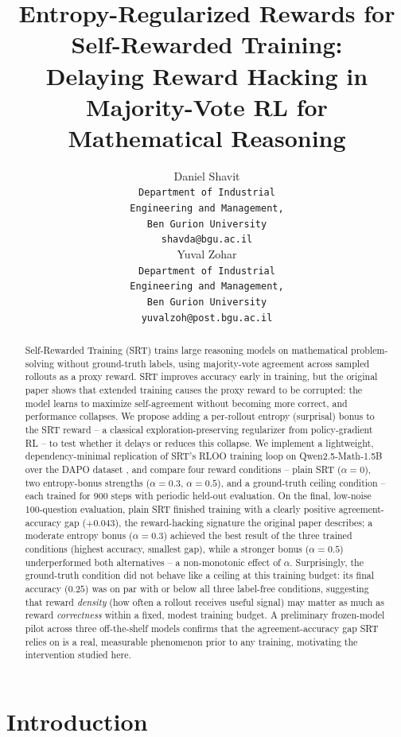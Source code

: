 \documentclass{article}
\title{Entropy-Regularized Rewards for Self-Rewarded Training: \\
Delaying Reward Hacking in Majority-Vote RL for Mathematical Reasoning}
\author{
  Daniel Shavit \\
  \texttt{Department of Industrial} \\
  \texttt{Engineering and Management,} \\
  \texttt{Ben Gurion University} \\
  \texttt{shavda@bgu.ac.il} \\
  \And
  Yuval Zohar \\
  \texttt{Department of Industrial} \\
  \texttt{Engineering and Management,} \\
  \texttt{Ben Gurion University} \\
  \texttt{yuvalzoh@post.bgu.ac.il} \\
}
\begin{document}
\maketitle

\begin{abstract}
Self-Rewarded Training (SRT) \citep{shafayat2025srt} trains large reasoning
models on mathematical problem-solving without ground-truth labels, using
majority-vote agreement across sampled rollouts as a proxy reward. SRT
improves accuracy early in training, but the original paper shows that
extended training causes the proxy reward to be corrupted: the model learns to
maximize self-agreement without becoming more correct, and performance
collapses. We propose adding a per-rollout entropy (surprisal) bonus to the
SRT reward -- a classical exploration-preserving regularizer from
policy-gradient RL \citep{williams1991function,mnih2016a3c,haarnoja2018sac} --
to test whether it delays or reduces this collapse. We implement a
lightweight, dependency-minimal replication of SRT's RLOO training loop on
Qwen2.5-Math-1.5B over the DAPO dataset \citep{yu2025dapo}, and compare four
reward conditions -- plain SRT ($\alpha{=}0$), two entropy-bonus strengths
($\alpha{=}0.3$, $\alpha{=}0.5$), and a ground-truth ceiling condition -- each
trained for 900 steps with periodic held-out evaluation. On the final,
low-noise 100-question evaluation, plain SRT finished training with a
clearly positive agreement-accuracy gap ($+0.043$), the reward-hacking
signature the original paper describes; a moderate entropy bonus
($\alpha{=}0.3$) achieved the best result of the three trained conditions
(highest accuracy, smallest gap), while a stronger bonus ($\alpha{=}0.5$)
underperformed both alternatives -- a non-monotonic effect of $\alpha$.
Surprisingly, the ground-truth
condition did not behave like a ceiling at this training budget: its final
accuracy ($0.25$) was on par with or below all three label-free conditions,
suggesting that reward \emph{density} (how often a rollout receives useful
signal) may matter as much as reward \emph{correctness} within a fixed,
modest training budget. A preliminary frozen-model pilot across three off-the-shelf models
confirms that the agreement-accuracy gap SRT relies on is a real, measurable
phenomenon prior to any training, motivating the intervention studied here.
\end{abstract}

\section{Introduction}
\end{document}
